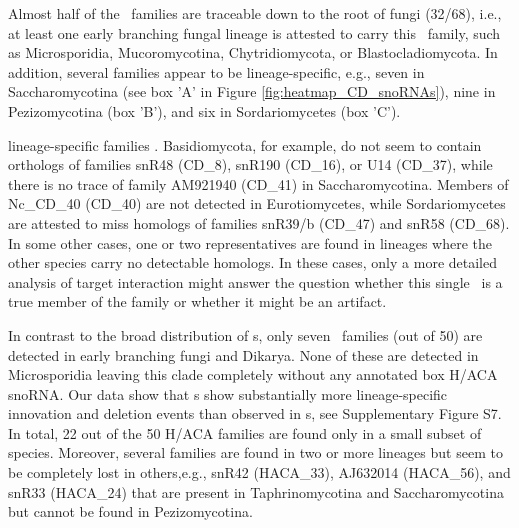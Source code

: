 Almost half of the \cd\ families are traceable down to the root of fungi
(32/68), i.e., at least one early branching fungal lineage is attested to
carry this \sno\ family, such as Microsporidia, Mucoromycotina,
Chytridiomycota, or Blastocladiomycota. In addition, several families
appear to be lineage-specific, e.g., seven in Saccharomycotina (see box 'A'
in Figure \ref{fig:heatmap_CD_snoRNAs}), nine in Pezizomycotina (box 'B'),
and six in Sordariomycetes (box 'C').

 lineage-specific families . Basidiomycota, for example, do not
seem to contain orthologs of families snR48 (CD\_8), snR190 (CD\_16), or
U14 (CD\_37), while there is no trace of family AM921940 (CD\_41) in
Saccharomycotina. Members of Nc\_CD\_40 (CD\_40) are not detected in
Eurotiomycetes, while Sordariomycetes are attested to miss homologs of
families snR39/b (CD\_47) and snR58 (CD\_68). In some other cases, one or
two representatives are found in lineages where the other species carry no
detectable homologs. In these cases, only a more detailed analysis of
target interaction might answer the question whether this single \sno\ is a
true member of the family or whether it might be an artifact.

In contrast to the broad distribution of \cd s, only seven \haca\
families (out of 50) are detected in early branching fungi and
Dikarya. None of these are detected in Microsporidia leaving this
clade completely without any annotated box H/ACA snoRNA. Our data show
that \haca s show substantially more lineage-specific innovation and
deletion events than observed in \cd s, see Supplementary Figure
S7. In total, 22 out of the 50 H/ACA families are found only in a
small subset of species. Moreover, several families are found in two
or more lineages but seem to be completely lost in others,e.g.,
snR42 (HACA\_33), AJ632014 (HACA\_56), and snR33 (HACA\_24) that are
present in Taphrinomycotina and Saccharomycotina but cannot be found
in Pezizomycotina.

